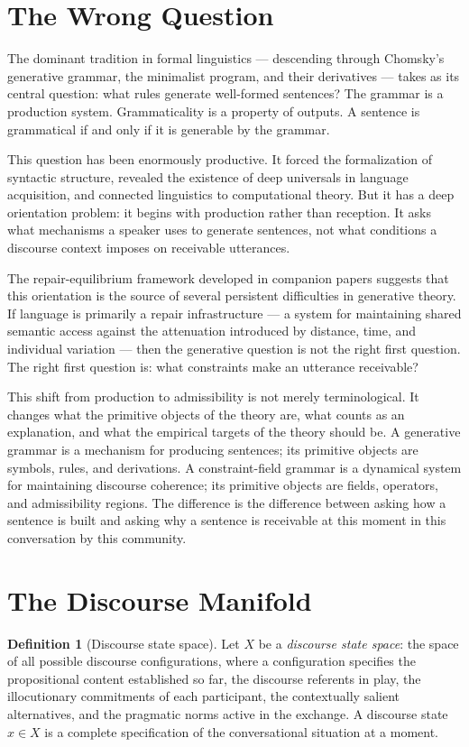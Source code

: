 \documentclass[11pt, a4paper]{article}
\theoremstyle{definition}
\newtheorem{definition}{Definition}
\theoremstyle{remark}
\begin{document}
\section{The Wrong Question}

The dominant tradition in formal linguistics --- descending through Chomsky's
generative grammar, the minimalist program, and their derivatives --- takes
as its central question: what rules generate well-formed sentences? The
grammar is a production system. Grammaticality is a property of outputs.
A sentence is grammatical if and only if it is generable by the grammar.

This question has been enormously productive. It forced the formalization of
syntactic structure, revealed the existence of deep universals in language
acquisition, and connected linguistics to computational theory. But it has
a deep orientation problem: it begins with production rather than reception.
It asks what mechanisms a speaker uses to generate sentences, not what
conditions a discourse context imposes on receivable utterances.

The repair-equilibrium framework developed in companion papers suggests that
this orientation is the source of several persistent difficulties in
generative theory. If language is primarily a repair infrastructure --- a
system for maintaining shared semantic access against the attenuation
introduced by distance, time, and individual variation --- then the
generative question is not the right first question. The right first question
is: what constraints make an utterance receivable?

This shift from production to admissibility is not merely terminological. It
changes what the primitive objects of the theory are, what counts as an
explanation, and what the empirical targets of the theory should be. A
generative grammar is a mechanism for producing sentences; its primitive
objects are symbols, rules, and derivations. A constraint-field grammar is
a dynamical system for maintaining discourse coherence; its primitive objects
are fields, operators, and admissibility regions. The difference is the
difference between asking how a sentence is built and asking why a sentence
is receivable at this moment in this conversation by this community.

\section{The Discourse Manifold}

\begin{definition}[Discourse state space]
Let $X$ be a \textit{discourse state space}: the space of all possible
discourse configurations, where a configuration specifies the propositional
content established so far, the discourse referents in play, the illocutionary
commitments of each participant, the contextually salient alternatives, and
the pragmatic norms active in the exchange. A discourse state $x \in X$ is
a complete specification of the conversational situation at a moment.
\end{definition}
\end{document}
